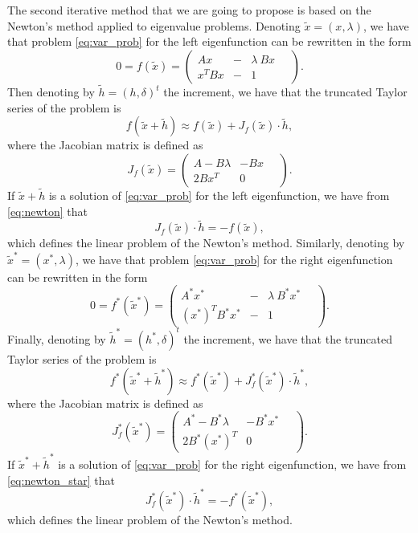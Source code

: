 \documentclass[smallextended]{svjour3}
\begin{document}
The second iterative method that we are going to propose is based on the Newton's 
method applied to eigenvalue problems. Denoting $\tilde x=(x,\lambda)$, we 
have that problem \eqref{eq:var_prob} for the left eigenfunction can be rewritten in the form
$$
0=f(\tilde x)=
\left(
\begin{array}{lcl}
A x&-& \lambda\ Bx
\\
  x^T Bx&-& 1
\end{array}\quad
\right) .
$$
Then denoting by $\tilde h=(h, \delta)^t$ the increment, we have that the truncated Taylor series of the problem is
\begin{equation}\label{eq:newton}
f(\tilde x + \tilde h)\approx f(\tilde x) + J_f(\tilde x)\cdot \tilde h, 
\end{equation}
where the Jacobian matrix is defined as
$$
J_f(\tilde x)=
\left(
\begin{array}{lr}
A - B\lambda & -Bx
\\
  2Bx^T  & 0
\end{array}\quad
\right) .
$$
If $\tilde x + \tilde h$ is a solution of \eqref{eq:var_prob} for the left eigenfunction, we have from \eqref{eq:newton}
that 
$$
J_f(\tilde x)\cdot \tilde h = - f(\tilde x),
$$
which defines the linear problem of the Newton's method.
Similarly, denoting by $\tilde x^*=(x^*,\lambda)$, we have that problem \eqref{eq:var_prob} 
for the right eigenfunction can be rewritten in the form
$$
0=f^*(\tilde x^*)=
\left(
\begin{array}{lcl}
A^* x^*&-& \lambda\ B^*x^*
\\
  (x^*)^T B^*x^*&-& 1
\end{array}\quad
\right) .
$$
Finally, denoting by $\tilde h^*=(h^*, \delta)^t$ the increment, we have that the truncated Taylor series of the problem is
\begin{equation}\label{eq:newton_star}
f^*(\tilde x^* + \tilde h^*)\approx f^*(\tilde x^*) + J_f^*(\tilde x^*)\cdot \tilde h^*, 
\end{equation}
where the Jacobian matrix is defined as
$$
J_f^*(\tilde x^*)=
\left(
\begin{array}{lr}
A^* - B^*\lambda & -B^*x^*
\\
  2B^*(x^*)^T  & 0
\end{array}\quad
\right) .
$$
If  $\tilde x^* + \tilde h^*$ is a solution of \eqref{eq:var_prob} for the right eigenfunction, we have from \eqref{eq:newton_star}
that 
$$
J_f^*(\tilde x^*)\cdot \tilde h^* = - f^*(\tilde x^*),
$$
which defines the linear problem of the Newton's method.
\end{document}
